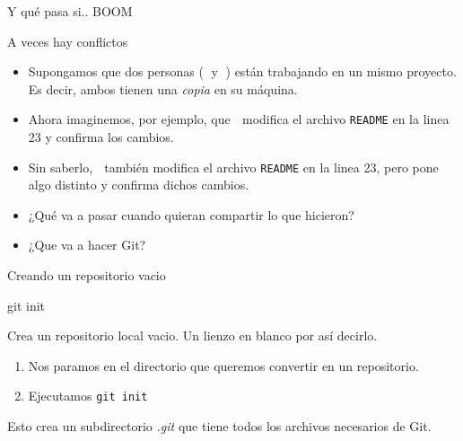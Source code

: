 \begin{frame}[t]{Y qué pasa si.. BOOM}

    \begin{block}{A veces hay conflictos}
        \begin{itemize}
            \item Supongamos que dos personas (👨 y 👩) están trabajando en un mismo proyecto.
                Es decir, ambos tienen una \textit{copia} en su máquina.
            \pause
            \item Ahora imaginemos, por ejemplo, que 👨 modifica el archivo \texttt{README} en la linea 23
                y confirma los cambios.
            \pause
            \item Sin saberlo, 👩 también modifica el archivo \texttt{README} en la linea 23, pero pone algo distinto y confirma dichos cambios.
            \pause
            \item ¿Qué va a pasar cuando quieran compartir lo que hicieron?\\ 
            \pause
            \item ¿Que va a hacer Git?\\ 
        \end{itemize}
    \end{block}

\end{frame}

\begin{frame}[t]{Creando un repositorio vacio}
    \begin{comando}
        git init
    \end{comando}

    \pause
    \begin{block}{}
        Crea un repositorio local vacio. Un lienzo en blanco por así decirlo.
        \begin{enumerate}
            \item Nos paramos en el directorio que queremos convertir en un repositorio.
            \item Ejecutamos \texttt{git init}
        \end{enumerate}
        Esto crea un subdirectorio \textit{.git} que tiene todos los archivos necesarios de Git.
    \end{block}
\end{frame}


